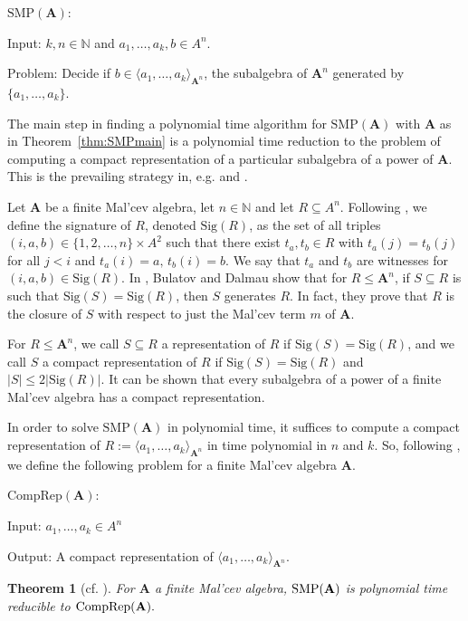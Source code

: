 \documentclass[12pt]{amsart}
\numberwithin{equation}{section}
\theoremstyle{plain}
\newtheorem{theorem}{Theorem}[section]
\theoremstyle{definition}
\newcommand{\A}{\mathbf{A}}
\newcommand{\N}{\mathbb{N}}
\newcommand{\SMP}{\text{SMP}}
\begin{document}
\noindent $\text{SMP}(\A)$:

\noindent  \quad Input: $k, n \in \N$ and $a_1, \ldots, a_k, b \in A^n$.

\noindent \quad Problem: Decide if $ b \in \langle a_1,\ldots,a_k \rangle_{\A^n}$, 
                          the subalgebra of $\A^n$ generated by $\{a_1, \dots, a_k\}$.

The main step in finding a polynomial time algorithm for $\SMP(\A)$ 
  with $\A$ as in Theorem~\ref{thm:SMPmain} is a polynomial time reduction to the problem of 
  computing a compact representation of a particular subalgebra of a power of $\A$.
This is the prevailing strategy in, e.g. \cite{Ma:SMP} and \cite{BMS:SMP}.

Let $\A$ be a finite Mal'cev algebra, let $n \in \N$  and let $R \subseteq A^n$. 
Following \cite{BD:ASA}, we define the signature of $R$, denoted $\text{Sig}(R)$, as the set of 
  all triples $(i, a, b) \in \{1,2, \ldots, n\} \times A^2$ 
  such that there exist $t_a, t_b \in R$ with $t_a(j) = t_b(j)$ for all $j < i$ 
  and $t_a(i)=a, \, t_b(i)=b$. 
We say that $t_a$ and $t_b$ are witnesses for $(i,a,b) \in \text{Sig}(R)$. 
In \cite{BD:ASA}, Bulatov and Dalmau show that 
  for $R \le \A^n$, if $S \subseteq R$ is such that $\text{Sig}(S) = \text{Sig}(R)$, 
  then $S$ generates $R$. 
In fact, they prove that $R$ is the closure of $S$ with respect to just the Mal'cev term $m$ of $\A$. 

For $R \le \A^n$, we call $S \subseteq R$ a representation of $R$ if $\text{Sig}(S) = \text{Sig}(R)$, 
  and we call $S$ a compact representation of $R$ if $\text{Sig}(S) = \text{Sig}(R)$ 
  and $|S| \le 2|\text{Sig}(R)|.$ 
It can be shown that every subalgebra of a power of a finite Mal'cev algebra has a compact representation. 

In order to solve $\SMP(\A)$ in polynomial time, it suffices to compute a compact representation 
  of $R:= \langle a_1, \dots, a_k \rangle_{\A^n}$  in time polynomial in $n$ and $k$. 
So, following \cite{BD:ASA}, we define the following problem for a finite Mal'cev algebra $\A$.

\noindent $\text{CompRep}(\A)$:

\noindent \quad  Input: $a_1, \ldots, a_k \in A^n$

\noindent \quad Output: A compact representation of $\langle a_1,\ldots,a_k \rangle_{\A^n}.$

\begin{theorem}[cf. \cite{BD:ASA}] For $\A$ a finite Mal'cev algebra, $\textup{SMP}(\A)$ is polynomial time reducible to $\textup{CompRep}(\A).$
\end{theorem}
\end{document}

